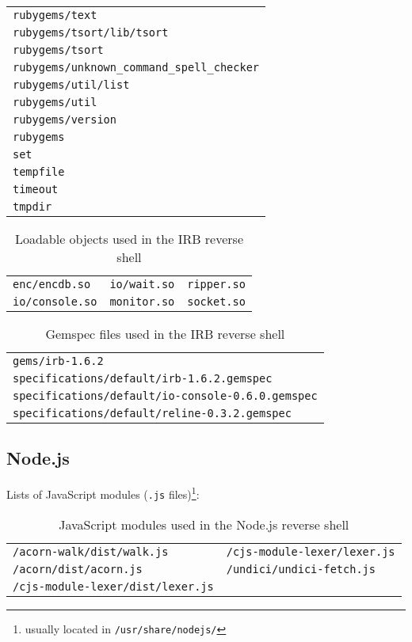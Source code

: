 \begin{longtable}{l}
\texttt{rubygems/text} \\
\texttt{rubygems/tsort/lib/tsort} \\
\texttt{rubygems/tsort} \\
\texttt{rubygems/unknown\_command\_spell\_checker} \\
\texttt{rubygems/util/list} \\
\texttt{rubygems/util} \\
\texttt{rubygems/version} \\
\texttt{rubygems} \\
\texttt{set} \\
\texttt{tempfile} \\
\texttt{timeout} \\
\texttt{tmpdir} \\
\end{longtable}

\begin{longtable}{l l l}
\caption{Loadable objects used in the IRB reverse shell}\label{tab:irb-dpd-so} \\
\texttt{enc/encdb.so} & \texttt{io/wait.so} & \texttt{ripper.so} \\
\texttt{io/console.so} & \texttt{monitor.so} & \texttt{socket.so} \\
\end{longtable}

\begin{longtable}{l}
\caption{Gemspec files used in the IRB reverse shell}\label{tab:irb-dpd-gemspec} \\
\texttt{gems/irb-1.6.2} \\
\texttt{specifications/default/irb-1.6.2.gemspec} \\
\texttt{specifications/default/io-console-0.6.0.gemspec} \\ \texttt{specifications/default/reline-0.3.2.gemspec} \\
\end{longtable}


\subsection*{Node.js}


Lists of JavaScript modules (\texttt{.js} files)\footnote{usually located in \texttt{/usr/share/nodejs/}}:

\begin{longtable}{l l}
\caption{JavaScript modules used in the Node.js reverse shell}\label{tab:node-dpd} \\
\texttt{/acorn-walk/dist/walk.js} & \texttt{/cjs-module-lexer/lexer.js} \\
\texttt{/acorn/dist/acorn.js} & \texttt{/undici/undici-fetch.js} \\
\texttt{/cjs-module-lexer/dist/lexer.js} & \\
\end{longtable}

